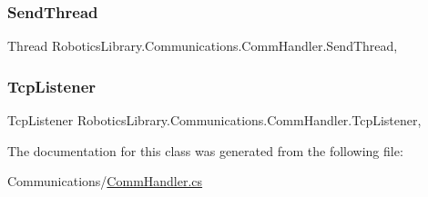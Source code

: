 \subsubsection{\texorpdfstring{Send\+Thread}{SendThread}}
{\footnotesize\ttfamily Thread Robotics\+Library.\+Communications.\+Comm\+Handler.\+Send\+Thread\hspace{0.3cm}{\ttfamily [static]}, {\ttfamily [private]}}

\mbox{\label{class_robotics_library_1_1_communications_1_1_comm_handler_a1f06912e8a026624986cda6fa0d7f7ac}} 
\subsubsection{\texorpdfstring{Tcp\+Listener}{TcpListener}}
{\footnotesize\ttfamily Tcp\+Listener Robotics\+Library.\+Communications.\+Comm\+Handler.\+Tcp\+Listener\hspace{0.3cm}{\ttfamily [static]}, {\ttfamily [private]}}



The documentation for this class was generated from the following file\+:\begin{DoxyCompactItemize}
\item 
Communications/\hyperlink{_comm_handler_8cs}{Comm\+Handler.\+cs}\end{DoxyCompactItemize}
